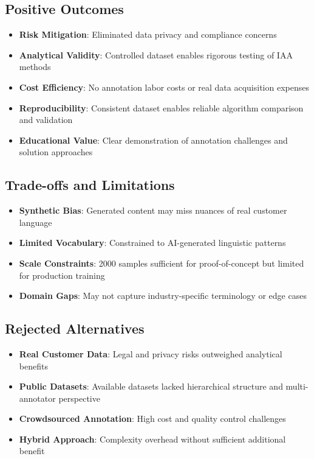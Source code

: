 \documentclass[11pt]{article}
\begin{document}
\subsection{Positive Outcomes}
\begin{itemize}
\item \textbf{Risk Mitigation}: Eliminated data privacy and compliance concerns
\item \textbf{Analytical Validity}: Controlled dataset enables rigorous testing of IAA methods
\item \textbf{Cost Efficiency}: No annotation labor costs or real data acquisition expenses
\item \textbf{Reproducibility}: Consistent dataset enables reliable algorithm comparison and validation
\item \textbf{Educational Value}: Clear demonstration of annotation challenges and solution approaches
\end{itemize}

\subsection{Trade-offs and Limitations}
\begin{itemize}
\item \textbf{Synthetic Bias}: Generated content may miss nuances of real customer language
\item \textbf{Limited Vocabulary}: Constrained to AI-generated linguistic patterns
\item \textbf{Scale Constraints}: 2000 samples sufficient for proof-of-concept but limited for production training
\item \textbf{Domain Gaps}: May not capture industry-specific terminology or edge cases
\end{itemize}

\subsection{Rejected Alternatives}
\begin{itemize}
\item \textbf{Real Customer Data}: Legal and privacy risks outweighed analytical benefits
\item \textbf{Public Datasets}: Available datasets lacked hierarchical structure and multi-annotator perspective
\item \textbf{Crowdsourced Annotation}: High cost and quality control challenges
\item \textbf{Hybrid Approach}: Complexity overhead without sufficient additional benefit
\end{itemize}
\end{document}
